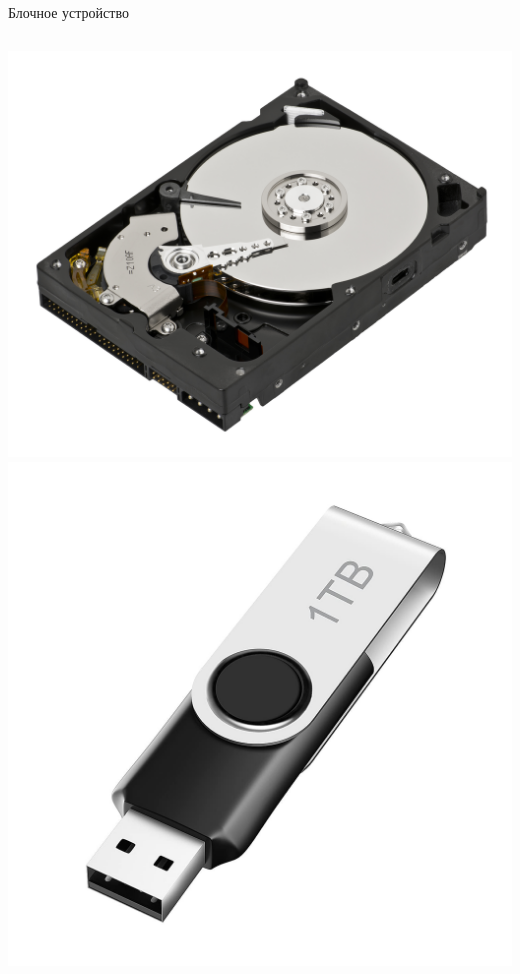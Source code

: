 \documentclass[aspectratio=169]{beamer}
\begin{document}
\begin{frame}{Блочное устройство}
\begin{columns}
    \begin{column}{.25\textwidth}
            \begin{center}
            \includegraphics[scale=0.07]{fig/6.hdd.jpg}
            \includegraphics[scale=0.06]{fig/7.flash.jpg}
            \end{center}
            
    \end{column}
\end{columns}
\end{frame}
\end{document}
